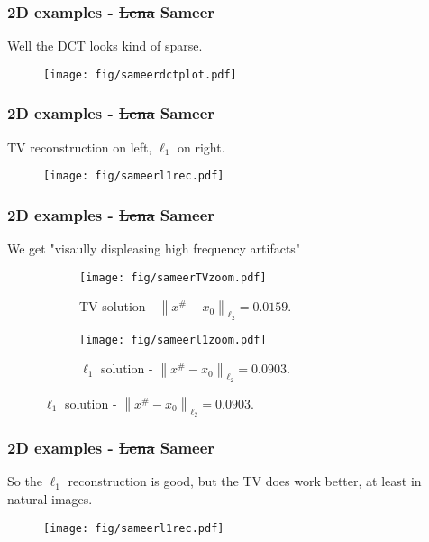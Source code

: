 \documentclass[mathserif,18pt,xcolor=table]{beamer}
\newcommand{\norm}[1]{\left\lVert #1 \right\rVert}
\begin{document}
\begin{frame}[t]
	\frametitle{2D examples - \st{Lena} Sameer}

Well the DCT looks kind of sparse.

\begin{figure}
\centering
\texttt{[image: fig/sameerdctplot.pdf]}
\end{figure}

\end{frame}

\begin{frame}[t]
	\frametitle{2D examples - \st{Lena} Sameer}

\centering
TV reconstruction on left, $\ell_1$ on right.
\begin{figure}
\centering
\texttt{[image: fig/sameerl1rec.pdf]}
\end{figure}

\end{frame}



\begin{frame}[t]
	\frametitle{2D examples - \st{Lena} Sameer}

We get "visaully displeasing high frequency artifacts"
\begin{figure}
\begin{subfigure}{0.5\textwidth}
  \centering
  \texttt{[image: fig/sameerTVzoom.pdf]}
  \caption{TV solution - $\norm{x^\# -x_0}_{\ell_2} = 0.0159$.}
\end{subfigure}%
\begin{subfigure}{0.5\textwidth}
  \centering
  \texttt{[image: fig/sameerl1zoom.pdf]}
  \caption{$\ell_1$ solution - $\norm{x^\# -x_0}_{\ell_2} = 0.0903$.}
\end{subfigure}
\end{figure}

\end{frame}


\begin{frame}[t]
	\frametitle{2D examples - \st{Lena} Sameer}

So the $\ell_1$ reconstruction is good, but the TV does work better, at least in natural images.
	
\begin{figure}
\centering
\texttt{[image: fig/sameerl1rec.pdf]}
\end{figure}

\end{frame}
\end{document}
